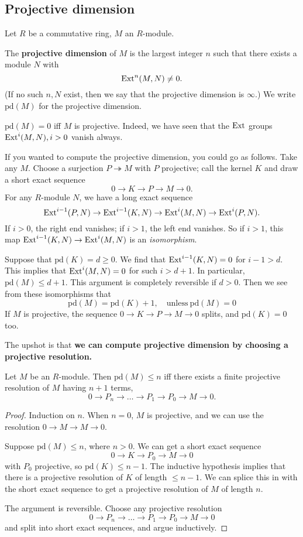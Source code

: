 \subsection{Projective dimension}

\newcommand{\pr}{\mathrm{pd}}
Let $R$ be a commutative ring, $M$ an $R$-module.

\begin{definition}
The \textbf{projective dimension} of $M$ is the largest integer
$n$ such that
there exists  a module $N$ with
\[ \mathrm{Ext}^n(M,N) \neq 0.  \]
(If no such $n,N$ exist, then we say that the projective
dimension is $\infty$.)
We write $\pr(M)$ for the projective dimension.
\end{definition}

\begin{remark}
$\pr(M) = 0$ iff $M$ is projective. Indeed, we have seen that
the $\mathrm{Ext}$ groups
$\mathrm{Ext}^i(M,N), i >0$
vanish always.
\end{remark}

If you wanted to compute the projective dimension, you could go
as follows.
Take any $M$. Choose a surjection $P \twoheadrightarrow M$ with
$P$ projective;
call the kernel $K$ and draw a short exact sequence
\[ 0 \to K \to P \to M \to 0.  \]
For any $R$-module $N$, we have a long exact sequence
\[ \mathrm{Ext}^{i-1}(P,N) \to \mathrm{Ext}^{i-1}(K,N) \to \mathrm{Ext}^i(M,N) \to
\mathrm{Ext}^i(P, N). \]
If $i >0$, the right end vanishes; if $i >1$, the left end
vanishes. So if $i
>1$, this map $\mathrm{Ext}^{i-1}(K,N) \to \mathrm{Ext}^i(M,N)$ is an
\emph{isomorphism}.

Suppose that $\pr(K) = d \geq 0$. We find that
$\mathrm{Ext}^{i-1}(K,N)=0$ for $i-1
> d$.
This implies that $\mathrm{Ext}^i(M,N) = 0$ for such $i > d+1$. In
particular, $\pr(M)
\leq d+1$.
This argument is completely reversible if $d >0$.
Then we see from these isomorphisms that
\[ \boxed{\pr(M) = \pr(K)+1}, \quad \mathrm{unless} \ \pr(M)=0
\]
If $M$ is projective, the sequence $0 \to K \to P \to M \to 0$
splits, and
$\pr(K)=0$ too.

The upshot is that \textbf{we can compute projective dimension
by choosing a
projective resolution.}
\begin{proposition}
Let $M$ be an $R$-module. Then $\pr(M) \leq n$ iff there exists
a finite
projective resolution of $M$ having $n+1$ terms,
\[ 0 \to P_n \to \dots \to P_1 \to P_0 \to M \to 0.  \]
\end{proposition}
\begin{proof}
Induction on $n$. When $n = 0$, $M$ is projective, and we can
use the
resolution $0 \to M \to M \to 0$.

Suppose $\pr(M) \leq n$, where $n >0$. We can get a short exact
sequence
\[ 0 \to K \to P_0 \to M \to 0  \]
with $P_0$ projective, so $\pr(K) \leq n-1$. The inductive
hypothesis implies
that there is a projective resolution of $K$ of length $\leq
n-1$. We can
splice this in with the short exact sequence to get a projective
resolution of
$M$ of length $n$.

The argument is reversible. Choose any projective resolution
\[  0 \to P_n \to \dots \to P_1 \to P_0 \to M \to 0 \]
and split into short exact sequences, and argue inductively.
\end{proof}


